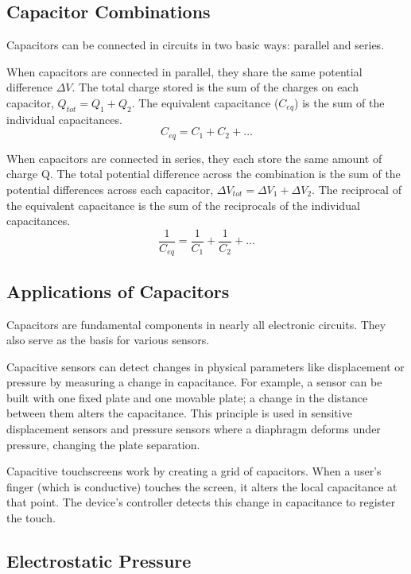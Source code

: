 \subsection{Capacitor Combinations}

Capacitors can be connected in circuits in two basic ways: parallel and series.

When capacitors are connected in parallel, they share the same potential difference $\Delta V$. The total charge stored is the sum of the charges on each capacitor, $Q_{tot} = Q_1 + Q_2$. The equivalent capacitance ($C_{eq}$) is the sum of the individual capacitances.
\begin{equation*}
C_{eq} = C_1 + C_2 + \dots
\end{equation*}

When capacitors are connected in series, they each store the same amount of charge Q. The total potential difference across the combination is the sum of the potential differences across each capacitor, $\Delta V_{tot} = \Delta V_1 + \Delta V_2$. The reciprocal of the equivalent capacitance is the sum of the reciprocals of the individual capacitances.
\begin{equation*}
\frac{1}{C_{eq}} = \frac{1}{C_1} + \frac{1}{C_2} + \dots
\end{equation*}

\subsection{Applications of Capacitors}

Capacitors are fundamental components in nearly all electronic circuits. They also serve as the basis for various sensors.

Capacitive sensors can detect changes in physical parameters like displacement or pressure by measuring a change in capacitance. For example, a sensor can be built with one fixed plate and one movable plate; a change in the distance between them alters the capacitance. This principle is used in sensitive displacement sensors and pressure sensors where a diaphragm deforms under pressure, changing the plate separation.

Capacitive touchscreens work by creating a grid of capacitors. When a user's finger (which is conductive) touches the screen, it alters the local capacitance at that point. The device's controller detects this change in capacitance to register the touch.

\subsection{Electrostatic Pressure}

